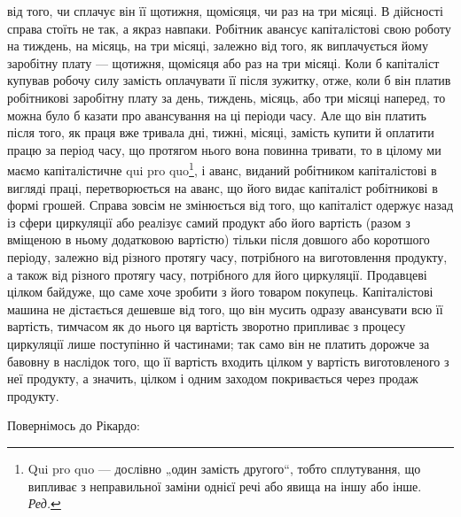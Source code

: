 \parcont{}  %
від того, чи сплачує він її щотижня, щомісяця, чи раз на три місяці.
В дійсності справа стоїть не так, а якраз навпаки. Робітник авансує
капіталістові свою роботу на тиждень, на місяць, на три місяці, залежно
від того, як виплачується йому заробітну плату — щотижня, щомісяця або
раз на три місяці. Коли б капіталіст купував робочу силу замість
оплачувати її після зужитку, отже, коли б він платив робітникові заробітну
плату за день, тиждень, місяць, або три місяці наперед, то можна
було б казати про авансування на ці періоди часу. Але що він платить
після того, як праця вже тривала дні, тижні, місяці, замість купити й
оплатити працю за період часу, що протягом нього вона повинна тривати,
то в цілому ми маємо капіталістичне qui pro quo\footnote*{
Qui pro quo — дослівно „один замість другого“, тобто сплутування, що
випливає з неправильної заміни однієї речі або явища на іншу або інше. \emph{Ред.}
}, і аванс, виданий
робітником капіталістові в вигляді праці, перетворюється на аванс, що
його видає капіталіст робітникові в формі грошей. Справа зовсім не змінюється
від того, що капіталіст одержує назад із сфери циркуляції або
реалізує самий продукт або його вартість (разом з вміщеною в ньому
додатковою вартістю) тільки після довшого або коротшого періоду, залежно
від різного протягу часу, потрібного на виготовлення продукту,
а також від різного протягу часу, потрібного для його циркуляції. Продавцеві
цілком байдуже, що саме хоче зробити з його товаром покупець.
Капіталістові машина не дістається дешевше від того, що він мусить
одразу авансувати всю її вартість, тимчасом як до нього ця вартість
зворотно припливає з процесу циркуляції лише поступінно й частинами;
так само він не платить дорожче за бавовну в наслідок того, що її
вартість входить цілком у вартість виготовленого з неї продукту, а
значить, цілком і одним заходом покривається через продаж продукту.

Повернімось до Рікардо:

